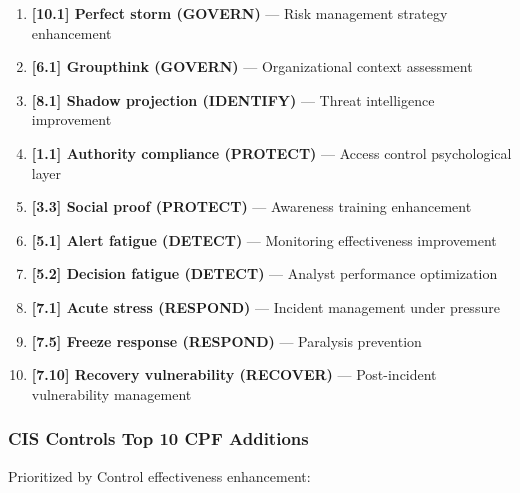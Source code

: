 \documentclass[11pt,a4paper]{article}
\begin{document}
\begin{enumerate}
\item \textbf{[10.1] Perfect storm (GOVERN)} --- Risk management strategy enhancement

\item \textbf{[6.1] Groupthink (GOVERN)} --- Organizational context assessment

\item \textbf{[8.1] Shadow projection (IDENTIFY)} --- Threat intelligence improvement

\item \textbf{[1.1] Authority compliance (PROTECT)} --- Access control psychological layer

\item \textbf{[3.3] Social proof (PROTECT)} --- Awareness training enhancement

\item \textbf{[5.1] Alert fatigue (DETECT)} --- Monitoring effectiveness improvement

\item \textbf{[5.2] Decision fatigue (DETECT)} --- Analyst performance optimization

\item \textbf{[7.1] Acute stress (RESPOND)} --- Incident management under pressure

\item \textbf{[7.5] Freeze response (RESPOND)} --- Paralysis prevention

\item \textbf{[7.10] Recovery vulnerability (RECOVER)} --- Post-incident vulnerability management
\end{enumerate}

\subsubsection{CIS Controls Top 10 CPF Additions}

Prioritized by Control effectiveness enhancement:
\end{document}
